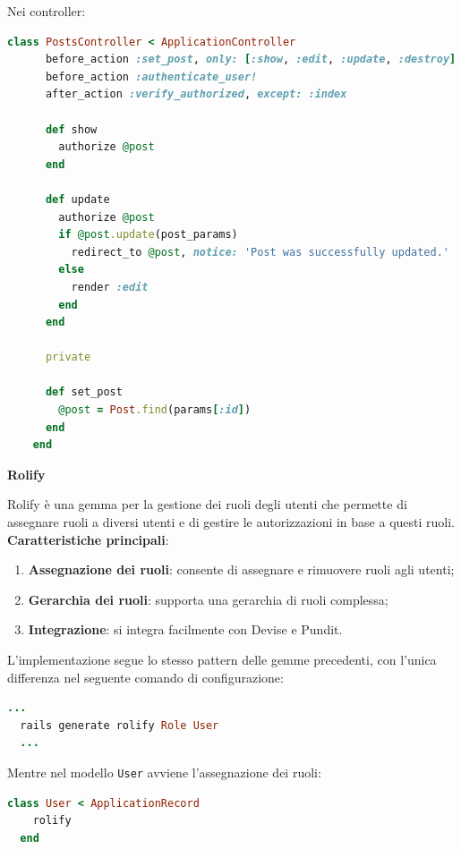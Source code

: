 \documentclass[a4paper, 12pt]{book}
\begin{document}
Nei controller:\\

\begin{lstlisting}[language=ruby, caption=Utilizzo delle policy nei controller]
    class PostsController < ApplicationController
      before_action :set_post, only: [:show, :edit, :update, :destroy]
      before_action :authenticate_user!
      after_action :verify_authorized, except: :index

      def show
        authorize @post
      end

      def update
        authorize @post
        if @post.update(post_params)
          redirect_to @post, notice: 'Post was successfully updated.'
        else
          render :edit
        end
      end

      private

      def set_post
        @post = Post.find(params[:id])
      end
    end
    \end{lstlisting}

\textbf{Rolify}

Rolify \cite{Rolify} è una gemma per la gestione dei ruoli degli utenti che permette di assegnare ruoli a diversi utenti e di gestire
le autorizzazioni in base a questi ruoli.\\

\textbf{Caratteristiche principali}:
\begin{enumerate}
  \item \textbf{Assegnazione dei ruoli}: consente di assegnare e rimuovere ruoli agli utenti;
  \item \textbf{Gerarchia dei ruoli}: supporta una gerarchia di ruoli complessa;
  \item \textbf{Integrazione}: si integra facilmente con Devise e Pundit.
\end{enumerate}

L'implementazione segue lo stesso pattern delle gemme precedenti, con l'unica differenza nel seguente comando di
configurazione:\\

\begin{lstlisting}[language=ruby, caption=Configurazione di Rolify]
  ...
  rails generate rolify Role User
  ...
  \end{lstlisting}

Mentre nel modello \texttt{User} avviene l'assegnazione dei ruoli:\\

\begin{lstlisting}[language=ruby, caption=Configurazione di Rolify]
  class User < ApplicationRecord
    rolify
  end
  \end{lstlisting}
\end{document}
